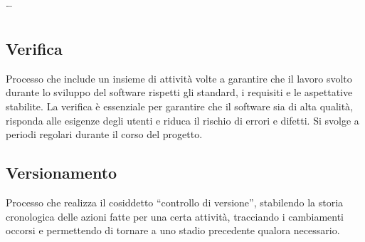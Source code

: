 \newpage



\section{}

\dots

\newpage



\section{}

\hypertarget{sec:verifica}{}
\subsection*{Verifica}
Processo che include un insieme di attività volte a garantire che il lavoro svolto durante lo sviluppo del software rispetti gli standard, i requisiti e 
le aspettative stabilite. La verifica è essenziale per garantire che il software sia di alta qualità, risponda alle esigenze degli utenti e riduca il 
rischio di errori e difetti. Si svolge a periodi regolari durante il corso del progetto.

\subsection*{Versionamento}
Processo che realizza il cosiddetto “controllo di versione”, stabilendo la storia cronologica delle azioni fatte per una certa attività, tracciando i 
cambiamenti occorsi e permettendo di tornare a uno stadio precedente qualora necessario.

\newpage